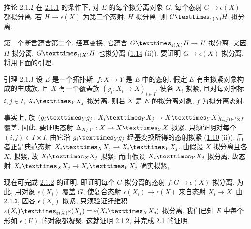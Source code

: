 \begin{enonce*}{推论 2.1.2}
在 \hyperref[VI.cor2.1.1]{2.1.1} 的条件下,
对 $E$ 的每个拟分离对象 $G$,
每个态射 $G\to\epsilon(X)$ 都拟分离.
若 $H\to\epsilon(X)$ 为第二个态射, $H$ 拟分离,
则 $\fprod{G}{H}{\epsilon(X)}$ 拟分离.
\end{enonce*}

第一个断言蕴含第二个:
经基变换, 它蕴含 $\fprod{G}{H}{\epsilon(X)}\to H$ 拟分离;
又因 $H$ 拟分离,
$\fprod{G}{H}{\epsilon(X)}$ 也拟分离
(\hyperref[VI.prop1.14]{1.14} (ii)).
要证明 $G\to\epsilon(X)$ 拟分离, 将用下面的引理.

\begin{enonce*}{引理 2.1.3}
设 $E$ 是一个拓扑斯, $f:X\to Y$ 是 $E$ 中的态射.
假定 $E$ 有由拟紧对象构成的生成族,
且 $X$ 有一个覆盖族 $(g_i:X_i\to X)_{i\in I}$,
使各 $X_i$ 拟紧, 且对每对指标 $i,j\in I$,
$\fprod{X_i}{X_j}{Y}$ 拟分离.
则若 $X$ 是 $E$ 的拟分离对象, $f$ 为拟分离态射.
\end{enonce*}

事实上, 族
$(\fprod{g_i}{g_j}{Y}:\fprod{X_i}{X_j}{Y}\to
\fprod{X}{X}{Y})_{(i,j)\in I\times I}$ 覆盖.
因此, 要证明态射 $\Delta_{X/Y}:X\to\fprod{X}{X}{Y}$ 拟紧,
只须证明对每个 $(i,j)\in I\times I$,
由它沿 $\fprod{g_i}{g_j}{Y}$ 经基变换\pageoriginale{}所得的态射拟紧
(\hyperref[VI.prop1.10]{1.10} (ii)).
后者正是典范态射
$\fprod{X_i}{X_j}{X}\to\fprod{X_i}{X_j}{Y}$.
由假设 $X$ 拟分离且各 $X_i$ 拟紧,
故 $\fprod{X_i}{X_j}{X}$ 拟紧;
而由假设 $\fprod{X_i}{X_j}{Y}$ 拟分离,
故态射 $\fprod{X_i}{X_j}{X}\to\fprod{X_i}{X_j}{Y}$ 确实拟紧, \cqfd

现在可完成 \hyperref[VI.cor2.1.2]{2.1.2} 的证明,
即证明每个 $G$ 拟分离的态射 $f:G\to\epsilon(X)$ 拟分离.
为此, 用对象 $\epsilon(X_i)$ 覆盖 $G$,
使复合态射 $\epsilon(X_i)\to\epsilon(X)$ 来自态射 $X_i\to X$.
由 \hyperref[VI.lem2.1.3]{2.1.3},
因各 $\epsilon(X_i)$ 拟紧,
只须验证纤维积
$\fprod{\epsilon(X_i)}{\epsilon(X_j)}{\epsilon(X)}=
\epsilon(\fprod{X_i}{X_j}{X})$ 拟分离.
我们已知 $E$ 中每个形如 $\epsilon(U)$ 的对象都凝聚.
这就证明 \hyperref[VI.cor2.1.2]{2.1.2},
并完成 \hyperref[VI.prop2.1]{2.1} 的证明.


